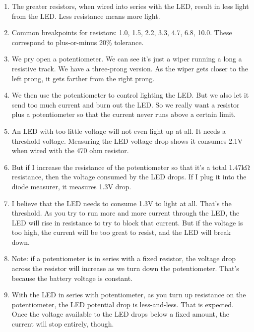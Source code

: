 \documentclass[11pt, oneside]{amsart}
\begin{document}
\begin{enumerate}
  \item The greater resistors, when wired into series with the LED,
  result in less light from the LED. Less resistance means more light.

  \item Common breakpoints for resistors: 1.0, 1.5, 2.2, 3.3, 4.7, 6.8,
  10.0. These correspond to plus-or-minus 20\% tolerance.

  \item We pry open a potentiometer. We can see it's just a wiper
  running a long a resistive track. We have a three-prong version. As
  the wiper gets closer to the left prong, it gets farther from the
  right prong.

  \item We then use the potentiometer to control lighting the LED. But
  we also let it send too much current and burn out the LED. So we
  really want a resistor plus a potentiometer so that the current never
  runs above a certain limit.

  \item An LED with too little voltage will not even light up at all. It
  needs a threshold voltage. Measuring the LED voltage drop shows it
  consumes 2.1V when wired with the 470 ohm resistor.

  \item But if I increase the resistance of the potentiometer so that
  it's a total 1.47kΩ resistance, then the voltage consumed by the LED
  drops. If I plug it into the diode measurer, it measures 1.3V drop.

  \item I believe that the LED needs to consume 1.3V to light at all.
  That's the threshold. As you try to run more and more current through
  the LED, the LED will rise in resistance to try to block that current.
  But if the voltage is too high, the current will be too great to
  resist, and the LED will break down.

  \item Note: if a potentiometer is in series with a fixed resistor, the
  voltage drop across the resistor will increase as we turn down the
  potentiometer. That's because the battery voltage is constant.

  \item With the LED in series with potentiometer, as you turn up
  resistance on the potentiometer, the LED potential drop is
  less-and-less. That is expected. Once the voltage available to the LED
  drops below a fixed amount, the current will stop entirely, though.


\end{enumerate}
\end{document}
